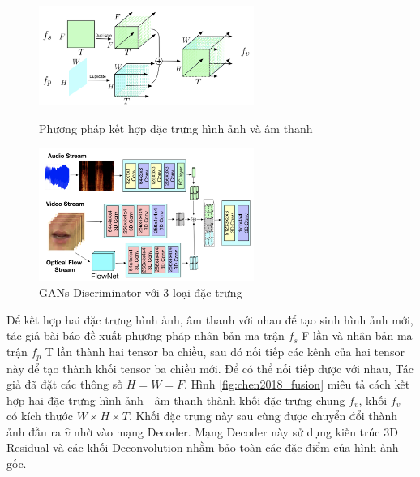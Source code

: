 \begin{figure}[H]
    \centering
    \begin{minipage}{0.48\textwidth}
        \includegraphics[width=7cm]{./content/images/chen2018_fusion.png}
        \caption{Phương pháp kết hợp đặc trưng hình ảnh và âm thanh}
        \label{fig:chen2018_fusion}
    \end{minipage}\hfill
    \begin{minipage}{0.48\textwidth}
        \includegraphics[width=7cm]{./content/images/chen2018_gans.png}
        \caption{GANs Discriminator với 3 loại đặc trưng}
        \label{fig:chen2018_gans}
    \end{minipage}
\end{figure}

Để kết hợp hai đặc trưng hình ảnh, âm thanh với nhau để tạo sinh hình ảnh mới, tác giả bài báo đề xuất phương pháp nhân bản ma trận $f_s$ F lần và nhân bản ma trận $f_p$ T lần thành hai tensor ba chiều, sau đó nối tiếp các kênh của hai tensor này để tạo thành khối tensor ba chiều mới. Để có thể nối tiếp được với nhau, Tác giả đã đặt các thông số $H = W = F$. Hình \ref{fig:chen2018_fusion} miêu tả cách kết hợp hai đặc trưng hình ảnh - âm thanh thành khối đặc trưng chung $f_v$, khối $f_v$ có kích thước $W \times H \times T$. Khối đặc trưng này sau cùng được chuyển đổi thành ảnh đầu ra $\hat{v}$ nhờ vào mạng Decoder. Mạng Decoder này sử dụng kiến trúc 3D Residual và các khối Deconvolution nhằm bảo toàn các đặc điểm của hình ảnh gốc.


